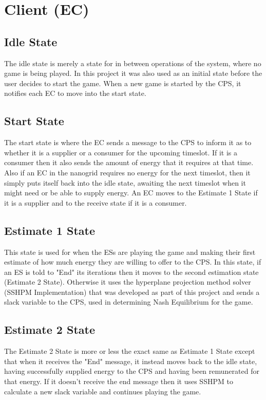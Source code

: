 \documentclass[a4paper, notitlepage]{report}
\begin{document}
\section{Client (EC)}
\label{sec:org6f59164}
\subsection{Idle State}
\label{sec:org63fda64}
The idle state is merely a state for in between operations of the system, where
no game is being played. In this project it was also used as an initial state
before the user decides to start the game. When a new game is started by the
CPS, it notifies each EC to move into the start state.
\subsection{Start State}
\label{sec:org2880876}
The start state is where the EC sends a message to the CPS to inform it as to
whether it is a supplier or a consumer for the upcoming timeslot. If it is a
consumer then it also sends the amount of energy that it requires at that time.
Also if an EC in the nanogrid requires no energy for the next timeslot, then it
simply puts itself back into the idle state, awaiting the next timeslot when it
might need or be able to supply energy. An EC moves to the Estimate 1 State if
it is a supplier and to the receive state if it is a consumer.
\subsection{Estimate 1 State}
\label{sec:org75cb5d7}
This state is used for when the ESs are playing the game and making their first
estimate of how much energy they are willing to offer to the CPS. In this state,
if an ES is told to "End" its iterations then it moves to the second estimation
state (Estimate 2 State). Otherwise it uses the hyperplane projection method
solver (SSHPM Implementation) that was developed as part of this project and
sends a slack variable to the CPS, used in determining Nash Equilibrium for the
game. 
\subsection{Estimate 2 State}
\label{sec:orgb809b33}
The Estimate 2 State is more or less the exact same as Estimate 1 State except
that when it receives the "End" message, it instead moves back to the idle
state, having successfully supplied energy to the CPS and having been
remunerated for that energy. If it doesn't receive the end message then it uses
SSHPM to calculate a new slack variable and continues playing the game.
\end{document}
